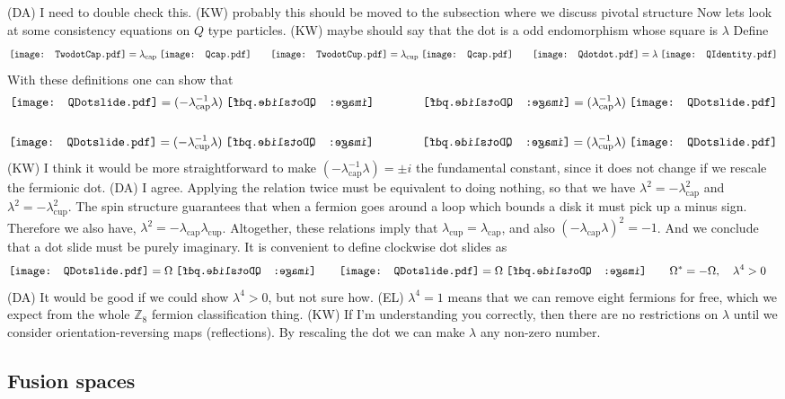 \documentclass[12pt,a4paper]{article}
\newcommand{\zz}{\mathbb{Z}}
\newcommand{\dave}[1]{{\color{ao(english)}\footnotesize{(DA) #1}}}
\newcommand{\ethan}[1]{{\color{amethyst}\footnotesize{(EL) #1}}}
\newcommand{\kw}[1]{{\color{kwcolor}\footnotesize{(KW) #1}}}
\newcommand{\Qcap}{\mathord{\vcenter{\hbox{\texttt{[image: Qcap.pdf]}}}}}
\newcommand{\Qcup}{\mathord{\vcenter{\hbox{\texttt{[image: Qcap.pdf]}}}}}
\newcommand{\Qdotdot}{\mathord{\vcenter{\hbox{\texttt{[image: Qdotdot.pdf]}}}}}
\newcommand{\QIdentity}{\mathord{\vcenter{\hbox{\texttt{[image: QIdentity.pdf]}}}}}
\newcommand{\QCapDotL}{\mathord{\vcenter{\hbox{\texttt{[image: QDotslide.pdf]}}}}}
\newcommand{\QCupDotR}{\mathord{\vcenter{\hbox{\texttt{[image: QDotslide.pdf]}}}}}
\newcommand{\QCapDotR}{\mathord{\vcenter{\hbox{\reflectbox{\texttt{[image: QDotslide.pdf]}}}}}}
\newcommand{\QCupDotL}{\mathord{\vcenter{\hbox{\reflectbox{\texttt{[image: QDotslide.pdf]}}}}}}
\newcommand{\TwodotCap}{\mathord{\vcenter{\hbox{\texttt{[image: TwodotCap.pdf]}}}}}
\newcommand{\TwodotCup}{\mathord{\vcenter{\hbox{\texttt{[image: TwodotCup.pdf]}}}}}
\begin{document}
\dave{I need to double check this.}
\kw{probably this should be moved to the subsection where we discuss pivotal structure}
Now lets look at some consistency equations on $Q$ type particles.
\kw{maybe should say that the dot is a odd endomorphism whose square is $\lambda$}
Define 
\begin{align}
\TwodotCap =  \lambda_{\text{cap}} \; \Qcap \quad \quad
\TwodotCup =  \lambda_{\text{cup}}\; \Qcup \quad \quad
\Qdotdot =  \lambda \; \QIdentity
\end{align}
With these definitions one can show that
\begin{align}
\QCapDotL =(-\lambda_{\text{cap}}^{-1} \lambda )\; \QCapDotR \qquad \qquad \QCapDotR  = (\lambda_{\text{cap}}^{-1} \lambda ) \; \QCapDotL\\ 
\\
\QCupDotR= (-\lambda_{\text{cup}}^{-1} \lambda )\; \QCupDotL \qquad \qquad \QCupDotL  = (\lambda_{\text{cup}}^{-1} \lambda) \; \QCupDotR
\end{align}
\kw{I think it would be more straightforward to make $(-\lambda_{\text{cap}}^{-1} \lambda ) = \pm i$ the fundamental constant,
since it does not change if we rescale the fermionic dot.}
\dave{I agree.}
Applying the relation twice must be equivalent to doing nothing, so that we have $\lambda^2 = -\lambda_{\text{cap}}^2$ and $\lambda^2 = -\lambda_{\text{cup}}^2$.
The spin structure guarantees that when a fermion goes around a loop which bounds a disk it must pick up a minus sign. 
Therefore we also have, $\lambda^2 = -\lambda_{\text{cap}} \lambda_{\text{cup}}$.
Altogether, these relations imply that $\lambda_{\text{cup}} = \lambda_{\text{cap}}$, and also $(-\lambda_{\text{cap}} \lambda)^2 = -1$.
And we conclude that a dot slide must be purely imaginary. It is convenient to define clockwise dot slides as
\begin{align}
&\QCapDotL =\Omega \; \QCapDotR \quad \quad \QCupDotR= \Omega \; \QCupDotL \quad \quad \Omega^* = -\Omega, \quad \lambda^4 >0
\end{align}
\dave{It would be good if we could show $\lambda^4>0$, but not sure how.} \ethan{$\lambda^4=1$ means that we can remove eight fermions for free, which we expect from the whole $\zz_8$ fermion classification thing.}
\kw{If I'm understanding you correctly, then there are no restrictions on $\lambda$ until we consider orientation-reversing maps (reflections).
By rescaling the dot we can make $\lambda$ any non-zero number.}


\subsection{Fusion spaces} \label{fusion_spaces}
\end{document}
